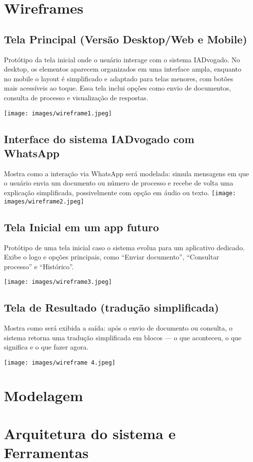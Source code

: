 \documentclass{article}
\begin{document}
\newpage

\section{Wireframes}

\subsection*{Tela Principal (Versão Desktop/Web e Mobile)}
Protótipo da tela inicial onde o usuário interage com o sistema IADvogado. No desktop, os elementos aparecem organizados em uma interface ampla, enquanto no mobile o layout é simplificado e adaptado para telas menores, com botões mais acessíveis ao toque. Essa tela inclui opções como envio de documentos, consulta de processo e visualização de respostas. 

\texttt{[image: images/wireframe1.jpeg]}

\newpage

\subsection*{Interface do sistema IADvogado com WhatsApp}
Mostra como a interação via WhatsApp será modelada: simula mensagens em que o usuário envia um documento ou número de processo e recebe de volta uma explicação simplificada, possivelmente com opção em áudio ou texto.
\texttt{[image: images/wireframe2.jpeg]}
\newpage

\subsection*{Tela Inicial em um app futuro}
Protótipo de uma tela inicial caso o sistema evolua para um aplicativo dedicado. Exibe o logo e opções principais, como “Enviar documento”, “Consultar processo” e “Histórico”.

\texttt{[image: images/wireframe3.jpeg]}

\subsection*{Tela de Resultado (tradução simplificada)}
Mostra como será exibida a saída: após o envio de documento ou consulta, o sistema retorna uma tradução simplificada em blocos — o que aconteceu, o que significa e o que fazer agora.

\texttt{[image: images/wireframe 4.jpeg]}


\section{Modelagem}

\section{Arquitetura do sistema e Ferramentas}   
    
\end{document}
